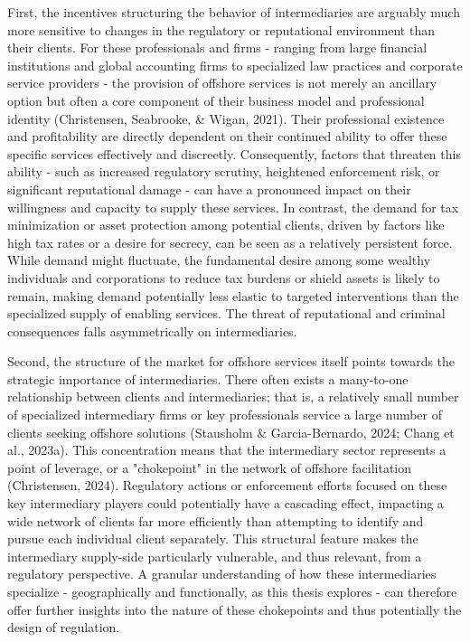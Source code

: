 First, the incentives structuring the behavior of intermediaries are arguably much more sensitive to changes in the regulatory or reputational environment than their clients. For these professionals and firms - ranging from large financial institutions and global accounting firms to specialized law practices and corporate service providers - the provision of offshore services is not merely an ancillary option but often a core component of their business model and professional identity (Christensen, Seabrooke, \& Wigan, 2021). Their professional existence and profitability are directly dependent on their continued ability to offer these specific services effectively and discreetly. Consequently, factors that threaten this ability - such as increased regulatory scrutiny, heightened enforcement risk, or significant reputational damage - can have a pronounced impact on their willingness and capacity to supply these services. In contrast, the demand for tax minimization or asset protection among potential clients, driven by factors like high tax rates or a desire for secrecy, can be seen as a relatively persistent force. While demand might fluctuate, the fundamental desire among some wealthy individuals and corporations to reduce tax burdens or shield assets is likely to remain, making demand potentially less elastic to targeted interventions than the specialized supply of enabling services. The threat of reputational and criminal consequences falls asymmetrically on intermediaries.

Second, the structure of the market for offshore services itself points towards the strategic importance of intermediaries. There often exists a many-to-one relationship between clients and intermediaries; that is, a relatively small number of specialized intermediary firms or key professionals service a large number of clients seeking offshore solutions (Stausholm \& Garcia-Bernardo, 2024; Chang et al., 2023a). This concentration means that the intermediary sector represents a point of leverage, or a "chokepoint" in the network of offshore facilitation (Christensen, 2024). Regulatory actions or enforcement efforts focused on these key intermediary players could potentially have a cascading effect, impacting a wide network of clients far more efficiently than attempting to identify and pursue each individual client separately. This structural feature makes the intermediary supply-side particularly vulnerable, and thus relevant, from a regulatory perspective. A granular understanding of how these intermediaries specialize - geographically and functionally, as this thesis explores - can therefore offer further insights into the nature of these chokepoints and thus potentially the design of regulation.

